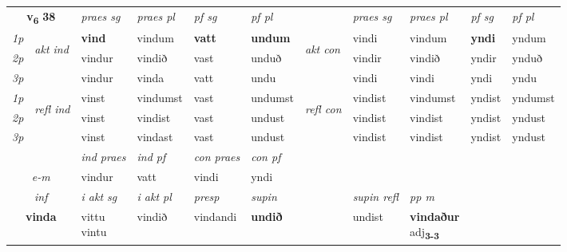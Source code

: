 \noindent
\begin{tabular}{lllllllllll} \toprule
\multicolumn{2}{c}{\textbf{v{\textsubscript{6}}} \Large{\textbf{38}}}  &  \textit{praes sg}  & \textit{praes pl}  &\textit{ pf sg} & \textit{pf pl} &  &  \textit{praes sg}  & \textit{praes pl}  & \textit{pf sg} & \textit{pf pl } \\*
	\cmidrule{3-6} \cmidrule{8-11}
 {\textit{1p}} & \multirow{3}{*}{\begin{turn}{90}\textit{akt ind}\end{turn}} & \textbf{vind} & vindum & \textbf{vatt} & \textbf{undum} & \multirow{3}{*}{\begin{turn}{90}\textit{akt con}\end{turn}} &vindi & vindum & \textbf{yndi} & yndum\\*
 {\textit{2p}} &  &  vindur  & vindið & vast & unduð & & vindir & vindið & yndir & ynduð \\*
{\textit{3p}} &  & vindur & vinda & vatt & undu & & vindi & vindi& yndi & yndu \\*
\cmidrule{3-6} \cmidrule{8-11}
 {\textit{1p}} & \multirow{3}{*}{\begin{turn}{90}\textit{refl ind}\end{turn}}  & vinst & vindumst & vast & undumst & \multirow{3}{*}{\begin{turn}{90}\textit{refl con}\end{turn}}  &vindist & vindumst & yndist & yndumst \\*
 {\textit{2p}} &  & vinst & vindist & vast & undust & &vindist & vindist & yndist & yndust \\*
 {\textit{3p}}  & & vinst & vindast & vast & undust & & vindist & vindist& yndist & yndust \\*
\cmidrule{3-6} \cmidrule{8-11}

   & &  \textit{ind praes} & \textit{ind pf} & \textit{con praes} & \textit{con pf} \\*
\multicolumn{2}{c}{ \textit{e-m} } & vindur & vatt & vindi & yndi \\*

\cmidrule{3-9}
   \multicolumn{2}{c}{\textit{inf}}  & \textit{i akt sg} & \textit{i akt pl}   & \textit{presp} & \textit{supin} && \textit{supin refl} & \textit{pp m} \\*
  \multicolumn{2}{c}{\textbf{vinda}} & \specialcell{vittu\\ vintu}  & vindið   & vindandi &  \textbf{undið} && undist & \specialcell{\textbf{vindaður} \\ adj\textbf{\textsubscript{3-3}}} \\*
\end{tabular}

